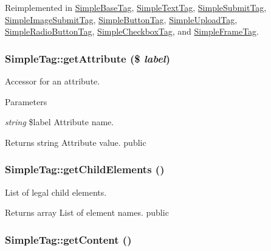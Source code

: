 Reimplemented in \hyperlink{class_simple_base_tag_aa3d88230adaca8282352b98bb5fbd03b}{SimpleBaseTag}, \hyperlink{class_simple_text_tag_aa1e96d7cb8af41a9fd588f5bf3cf8b26}{SimpleTextTag}, \hyperlink{class_simple_submit_tag_acab5ba6ae3a20d534172d2da5fb2d363}{SimpleSubmitTag}, \hyperlink{class_simple_image_submit_tag_ab999199b59399e7fc709c1b3a9f03227}{SimpleImageSubmitTag}, \hyperlink{class_simple_button_tag_a079c610a66083e6b4eea9a6beb8a8294}{SimpleButtonTag}, \hyperlink{class_simple_upload_tag_a86d768fcbd19fdb1bf8437d304f06fb7}{SimpleUploadTag}, \hyperlink{class_simple_radio_button_tag_a16eb9fffec50e8aa90caed5c838a2f0a}{SimpleRadioButtonTag}, \hyperlink{class_simple_checkbox_tag_aabd9d2caa814893d18b13945985a100a}{SimpleCheckboxTag}, and \hyperlink{class_simple_frame_tag_a2a20eeb19c812bb19b6c2c7e24bdc2ad}{SimpleFrameTag}.\hypertarget{class_simple_tag_adf9f23b7539f4d44984fd3f994205e59}{
\subsubsection[{getAttribute}]{\setlength{\rightskip}{0pt plus 5cm}SimpleTag::getAttribute (\$ {\em label})}}
\label{class_simple_tag_adf9f23b7539f4d44984fd3f994205e59}
Accessor for an attribute. 
\begin{DoxyParams}{Parameters}
\item[{\em string}]\$label Attribute name. \end{DoxyParams}
\begin{DoxyReturn}{Returns}
string Attribute value.  public 
\end{DoxyReturn}
\hypertarget{class_simple_tag_a23a987346d617cf9c50ee4937256e403}{
\subsubsection[{getChildElements}]{\setlength{\rightskip}{0pt plus 5cm}SimpleTag::getChildElements ()}}
\label{class_simple_tag_a23a987346d617cf9c50ee4937256e403}
List of legal child elements. \begin{DoxyReturn}{Returns}
array List of element names.  public 
\end{DoxyReturn}
\hypertarget{class_simple_tag_ab5e820ae55ae65b9accc7e72cbf1311b}{
\subsubsection[{getContent}]{\setlength{\rightskip}{0pt plus 5cm}SimpleTag::getContent ()}}
